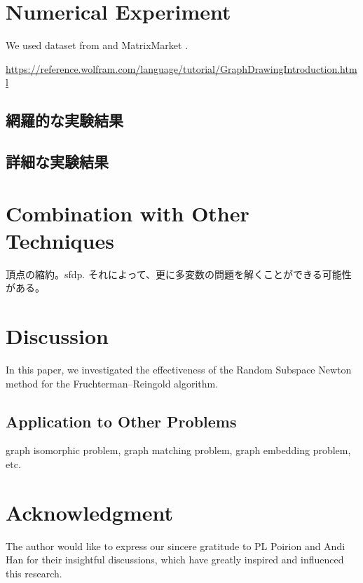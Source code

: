 \documentclass[dvipdfmx,journal]{IEEEtran}
\begin{document}
\section{Numerical Experiment} \label{sec:experiment}

We used dataset from \cite{davis2011university} and MatrixMarket \cite{boisvertMatrixMarketWeb1997}.

\url{https://reference.wolfram.com/language/tutorial/GraphDrawingIntroduction.html}

\subsection{網羅的な実験結果}\label{ssec:exprAll}
\subsection{詳細な実験結果}\label{ssec:exprDetail}

\section{Combination with Other Techniques}\label{sec:combination}

頂点の縮約。sfdp.
それによって、更に多変数の問題を解くことができる可能性がある。

\section{Discussion} \label{sec:discussion}

In this paper, we investigated the effectiveness of the Random Subspace Newton method for the Fruchterman--Reingold algorithm.

\subsection{Application to Other Problems}\label{ssec:application}

graph isomorphic problem, graph matching problem, graph embedding problem, etc.

\section{Acknowledgment}

The author would like to express our sincere gratitude to PL Poirion and Andi Han for their insightful discussions, which have greatly inspired and influenced this research.
\end{document}
